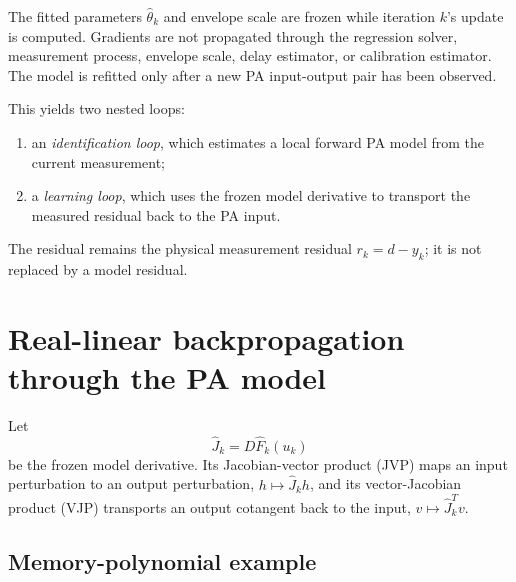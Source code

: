 \documentclass[10pt,a4paper]{article}
\newcommand{\Fhat}{\widehat F}
\newcommand{\Jhat}{\widehat J}
\begin{document}
The fitted parameters $\widehat\theta_k$ and envelope scale are frozen while iteration $k$'s update is
computed. Gradients are not propagated through the regression solver, measurement process, envelope scale,
delay estimator, or calibration estimator. The model is refitted only after a new PA input-output pair has
been observed.

This yields two nested loops:
\begin{enumerate}
  \item an \emph{identification loop}, which estimates a local forward PA model from the current measurement;
  \item a \emph{learning loop}, which uses the frozen model derivative to transport the measured residual
  back to the PA input.
\end{enumerate}
The residual remains the physical measurement residual $r_k=d-y_k$; it is not replaced by a model residual.

\section{Real-linear backpropagation through the PA model}

Let
\begin{equation}
  \Jhat_k=D\Fhat_k(u_k)
\end{equation}
be the frozen model derivative. Its Jacobian-vector product (JVP) maps an input perturbation to an output
perturbation, $h\mapsto\Jhat_kh$, and its vector-Jacobian product (VJP) transports an output cotangent back
to the input, $v\mapsto\Jhat_k^Tv$.

\subsection{Memory-polynomial example}
\end{document}
